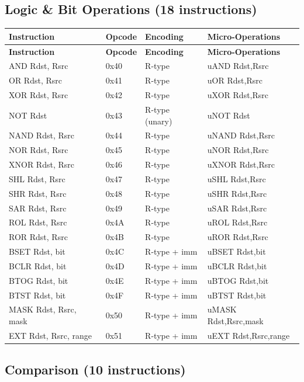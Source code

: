 \documentclass[12pt]{article}
\begin{document}
\subsection{Logic \& Bit Operations (18 instructions)}

\begin{longtable}{@{}L{3.2cm}L{1.5cm}L{1.7cm}L{4.8cm}@{}}
\toprule
\textbf{Instruction} & \textbf{Opcode} & \textbf{Encoding} & \textbf{Micro-Operations} \\ \midrule
\endfirsthead
\toprule
\textbf{Instruction} & \textbf{Opcode} & \textbf{Encoding} & \textbf{Micro-Operations} \\ \midrule
\endhead
AND Rdst, Rsrc & 0x40 & R-type & uAND Rdst,Rsrc \\
OR Rdst, Rsrc & 0x41 & R-type & uOR Rdst,Rsrc \\
XOR Rdst, Rsrc & 0x42 & R-type & uXOR Rdst,Rsrc \\
NOT Rdst & 0x43 & R-type (unary) & uNOT Rdst \\
NAND Rdst, Rsrc & 0x44 & R-type & uNAND Rdst,Rsrc \\
NOR Rdst, Rsrc & 0x45 & R-type & uNOR Rdst,Rsrc \\
XNOR Rdst, Rsrc & 0x46 & R-type & uXNOR Rdst,Rsrc \\
SHL Rdst, Rsrc & 0x47 & R-type & uSHL Rdst,Rsrc \\
SHR Rdst, Rsrc & 0x48 & R-type & uSHR Rdst,Rsrc \\
SAR Rdst, Rsrc & 0x49 & R-type & uSAR Rdst,Rsrc \\
ROL Rdst, Rsrc & 0x4A & R-type & uROL Rdst,Rsrc \\
ROR Rdst, Rsrc & 0x4B & R-type & uROR Rdst,Rsrc \\
BSET Rdst, bit & 0x4C & R-type + imm & uBSET Rdst,bit \\
BCLR Rdst, bit & 0x4D & R-type + imm & uBCLR Rdst,bit \\
BTOG Rdst, bit & 0x4E & R-type + imm & uBTOG Rdst,bit \\
BTST Rdst, bit & 0x4F & R-type + imm & uBTST Rdst,bit \\
MASK Rdst, Rsrc, mask & 0x50 & R-type + imm & uMASK Rdst,Rsrc,mask \\
EXT Rdst, Rsrc, range & 0x51 & R-type + imm & uEXT Rdst,Rsrc,range \\ \bottomrule
\end{longtable}

\subsection{Comparison (10 instructions)}
\end{document}

